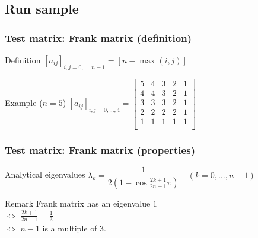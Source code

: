 \subsection{Run sample}


\begin{frame}[c,fragile]
  \frametitle{Test matrix: Frank matrix (definition)}
\begin{block}{Definition}
$[a_{ij}]_{i,j = {0, \dots, n-1}} = [ n - \max(i,j) ]$\\
\end{block}

\begin{block}{Example ($n=5$)}
$[a_{ij}]_{i,j = {0, \dots, 4}} =
\begin{bmatrix}
5 & 4 & 3 & 2 & 1 \\
4 & 4 & 3 & 2 & 1 \\
3 & 3 & 3 & 2 & 1 \\
2 & 2 & 2 & 2 & 1 \\
1 & 1 & 1 & 1 & 1 \\
\end{bmatrix}
$
\end{block}
\end{frame}

\begin{frame}[c,fragile]
  \frametitle{Test matrix: Frank matrix (properties)}
\begin{block}{Analytical eigenvalues}%
$\lambda_k = \dfrac{1}{2 \left( 1 - \cos{\tfrac{2 k + 1}{2 n + 1}\pi} \right)} \quad (k=0,\dots,n-1)$
\end{block}

\begin{block}{Remark}%
Frank matrix has an eigenvalue $1$\\
\quad $\Longleftrightarrow$ $\tfrac{2 k + 1}{2 n + 1} = \tfrac{1}{3}$\\
\quad $\Longleftrightarrow$ $n-1$ is a multiple of 3.
\end{block}
\end{frame}



